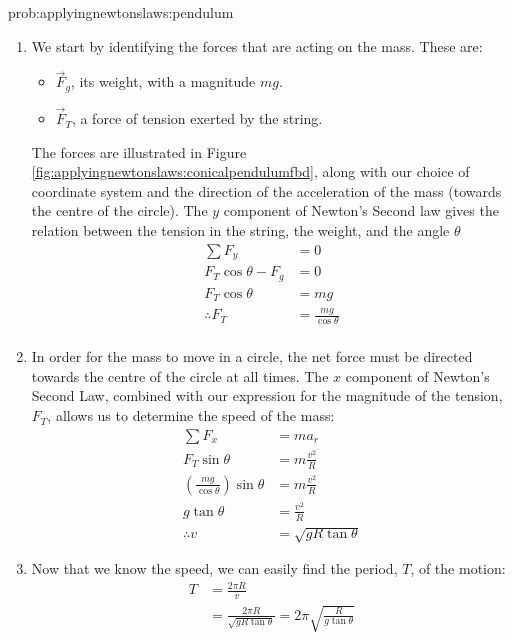 \begin{solution}{prob:applyingnewtonslaws:pendulum}\label{soln:applyingnewtonslaws:pendulum} 
\begin{enumerate}[label=\alph*)]
\item We start by identifying the forces that are acting on the mass. These are:
\begin{itemize}
\item $\vec F_g$, its weight, with a magnitude $mg$.
\item $\vec F_T$, a force of tension exerted by the string.
\end{itemize}
The forces are illustrated in Figure \ref{fig:applyingnewtonslaws:conicalpendulumfbd}, along with our choice of coordinate system and the direction of the acceleration of the mass (towards the centre of the circle).
The $y$ component of Newton's Second law gives the relation between the tension in the string, the weight, and the angle $\theta$
\begin{align*}
\sum F_y&=0 \\
F_T\cos\theta -F_g&=0 \\
F_T\cos\theta&=mg \\
\therefore F_T&=\frac{mg}{\cos\theta} \\
\end{align*}
\item In order for the mass to move in a circle, the net force must be directed towards the centre of the circle at all times. The $x$ component of Newton's Second Law, combined with our expression for the magnitude of the tension, $F_T$, allows us to determine the speed of the mass:
\begin{align*}
\sum F_x&=ma_r \\
F_T\sin\theta&=m\frac{v^2}{R}\\
\left(\frac{mg}{\cos\theta}\right)\sin\theta &=m\frac{v^2}{R}\\
g\tan\theta&=\frac{v^2}{R}\\
\therefore v &= \sqrt{gR\tan\theta}
\end{align*}
\item Now that we know the speed, we can easily find the period, $T$, of the motion:
\begin{align*}
T&=\frac{2\pi R}{v} \\
&=\frac{2\pi R}{\sqrt{gR\tan\theta }}=2\pi\sqrt{\frac{R}{g\tan\theta}}
\end{align*}

\end{enumerate}
\end{solution}

